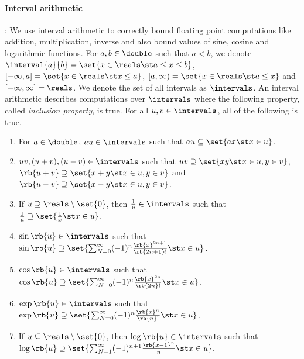 \paragraph{Interval arithmetic}:  We use interval arithmetic to
correctly bound floating point computations like addition,
multiplication, inverse and also bound values of sine, cosine and
logarithmic functions. For $a,b\in\double$ such that $a<b$, we
denote\\ $\interval{a}{b} = \set{x\in\reals\st a\leq x\leq b}$,
$[-\infty,a] = \set{x\in\reals\st x\leq a}$, $[a,\infty)
= \set{x\in\reals\st a\leq x}$ and $[-\infty,\infty] = \reals$.  We
denote the set of all intervals as $\intervals$.  An interval
arithmetic describes computations over $\intervals$ where the
following property, called \emph{inclusion property}, is true.  For
all $u,v\in\intervals$, all of the following is true.
%
\begin{enumerate}
\item For $a\in\double$, $au\in\intervals$ such that $au\subseteq \set{ax\st x\in u}$.
\item $uv,(u+v),(u-v)\in\intervals$ such that
$uv\supseteq\set{xy\st x\in u, y\in v}$,\\
$\rb{u+v}\supseteq\set{x+y\st x\in u, y\in v}$ and
$\rb{u-v}\supseteq\set{x-y\st x\in u, y\in v}$.
\item If $u\supseteq\reals\setminus\set{0}$, then $\frac{1}{u}\in\intervals$ such that $\frac{1}{u}\supseteq\set{\frac{1}{x}\st x\in u}$.
\item $\sin\rb{u}\in\intervals$ such that $\sin\rb{u}\supseteq\set{\sum_{N=0}^\infty(-1)^n\frac{\rb{x}^{2n+1}}{\rb{2n+1}!}\st x\in u}$.
\item $\cos\rb{u}\in\intervals$ such that $\cos\rb{u}\supseteq\set{\sum_{N=0}^\infty (-1)^n\frac{\rb{x}^{2n}}{\rb{2n}!}\st x\in u}$.
\item $\exp\rb{u}\in\intervals$ such that $\exp\rb{u}\supseteq\set{\sum_{N=0}^\infty(-1)^n\frac{\rb{x}^{n}}{\rb{n}!}\st x\in u}$.
\item If $u\subseteq\reals\setminus\set{0}$, then $\log\rb{u}\in\intervals$ such that\\ $\log\rb{u}\supseteq\set{\sum_{N=1}^\infty(-1)^{n+1}\frac{\rb{x-1}^{n}}{n}\st x\in u}$.
\end{enumerate}
%

